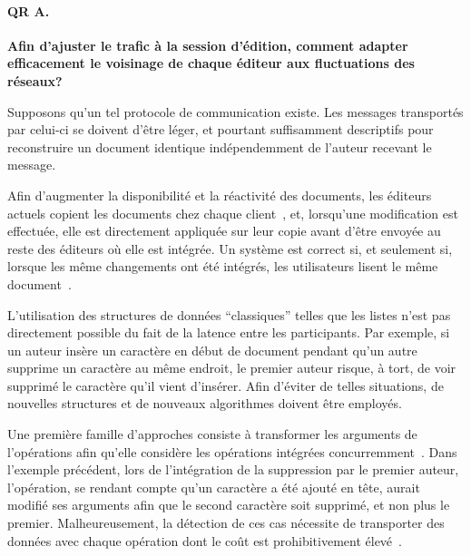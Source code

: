 \paragraph{QR A.} \textbf{Afin d'ajuster le trafic à la session d'édition,
  comment adapter efficacement le voisinage de chaque éditeur aux fluctuations
  des réseaux?}

  Supposons qu'un tel protocole de communication existe. Les messages
  transportés par celui-ci se doivent d'être léger, et pourtant suffisamment
  descriptifs pour reconstruire un document identique indépendemment de l'auteur
  recevant le message.

  Afin d'augmenter la disponibilité et la réactivité des documents, les éditeurs
  actuels copient les documents chez chaque client~\cite{saito2005optimistic},
  et, lorsqu'une modification est effectuée, elle est directement appliquée sur
  leur copie avant d'être envoyée au reste des éditeurs où elle est intégrée. Un
  système est correct si, et seulement si, lorsque les même changements ont été
  intégrés, les utilisateurs lisent le même
  document~\cite{burckhardt2014replicated, shapiro2011conflict}.

  L'utilisation des structures de données ``classiques'' telles que les listes
  n'est pas directement possible du fait de la latence entre les
  participants. Par exemple, si un auteur insère un caractère en début de
  document pendant qu'un autre supprime un caractère au même endroit, le premier
  auteur risque, à tort, de voir supprimé le caractère qu'il vient
  d'insérer. Afin d'éviter de telles situations, de nouvelles structures et de
  nouveaux algorithmes doivent être employés.

  Une première famille d'approches consiste à transformer les arguments de
  l'opérations afin qu'elle considère les opérations intégrées
  concurremment~\cite{sun1998operational}. Dans l'exemple précédent, lors de
  l'intégration de la suppression par le premier auteur, l'opération, se rendant
  compte qu'un caractère a été ajouté en tête, aurait modifié ses arguments afin
  que le second caractère soit supprimé, et non plus le
  premier. Malheureusement, la détection de ces cas nécessite de transporter des
  données avec chaque opération dont le coût est prohibitivement
  élevé~\cite{sun2009contextbased}.

